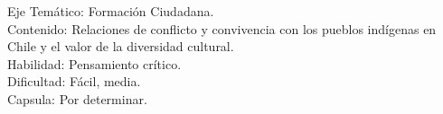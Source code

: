 \documentclass[letterpaper,11pt]{article}
\newcommand{\anchopregunta}{0.9\textwidth}
\begin{document}
\begin{enumerate}
\begin{minipage}{\anchopregunta}
\begin{answer}
\end{answer}
\begin{info} %
\begin{flushleft}
Eje Temático: Formación Ciudadana.\\
Contenido: Relaciones de conflicto y convivencia con los pueblos indígenas en Chile y el valor de la diversidad cultural.\\
Habilidad: Pensamiento crítico.\\
Dificultad: Fácil, media.\\
Capsula: Por determinar.\\
\end{flushleft} 
\end{info}
\end{minipage}\vfill$\;$ %


\end{enumerate}
\end{document}
